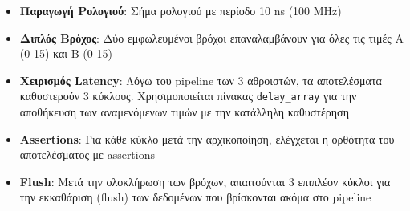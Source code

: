 \documentclass[12pt]{article}
\begin{document}
\begin{itemize}
    \item \textbf{Παραγωγή Ρολογιού}: Σήμα ρολογιού με περίοδο 10 ns (100 MHz)
    \item \textbf{Διπλός Βρόχος}: Δύο εμφωλευμένοι βρόχοι επαναλαμβάνουν για όλες τις τιμές A (0-15) και B (0-15)
    \item \textbf{Χειρισμός Latency}: Λόγω του pipeline των 3 αθροιστών, τα αποτελέσματα καθυστερούν 3 κύκλους. Χρησιμοποιείται πίνακας \texttt{delay\_array} για την αποθήκευση των αναμενόμενων τιμών με την κατάλληλη καθυστέρηση
    \item \textbf{Assertions}: Για κάθε κύκλο μετά την αρχικοποίηση, ελέγχεται η ορθότητα του αποτελέσματος με assertions
    \item \textbf{Flush}: Μετά την ολοκλήρωση των βρόχων, απαιτούνται 3 επιπλέον κύκλοι για την εκκαθάριση (flush) των δεδομένων που βρίσκονται ακόμα στο pipeline
\end{itemize}
\end{document}
